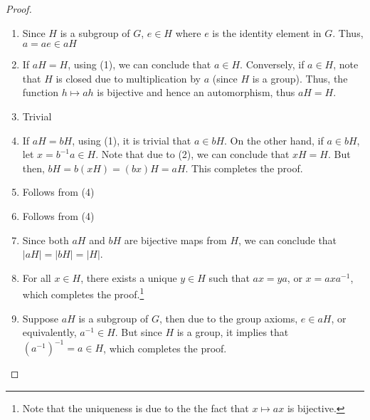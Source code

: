 \begin{proof}\hfill
	\begin{enumerate}
		\item Since $H$ is a subgroup of $G$, $e\in H$ where $e$ is the identity element in $G$. Thus, $a=ae\in aH$
		\item If $aH=H$, using (1), we can conclude that $a\in H$. Conversely, if $a\in H$, note that $H$ is closed due to multiplication by $a$ (since $H$ is a group). Thus, the function $h\mapsto ah$ is bijective and hence an automorphism, thus $aH=H$.
		\item Trivial
		\item If $aH=bH$, using (1), it is trivial that $a\in bH$. On the other hand, if $a\in bH$, let $x=b^{-1}a\in H$. Note that due to (2), we can conclude that $xH=H$. But then, $bH=b(xH)=(bx)H=aH$. This completes the proof.
		\item Follows from (4)
		\item Follows from (4)
		\item Since both $aH$ and $bH$ are bijective maps from $H$, we can conclude that $|aH|=|bH|=|H|$.
		\item For all $x\in H$, there exists a unique $y\in H$ such that $ax=ya$, or $x=axa^{-1}$, which completes the proof.\footnote{Note that the uniqueness is due to the the fact that $x\mapsto ax$ is bijective.}
		\item Suppose $aH$ is a subgroup of $G$, then due to the group axioms, $e\in aH$, or equivalently, $a^{-1}\in H$. But since $H$ is a group, it implies that $(a^{-1})^{-1}=a\in H$, which completes the proof.
	\end{enumerate}
\end{proof}

